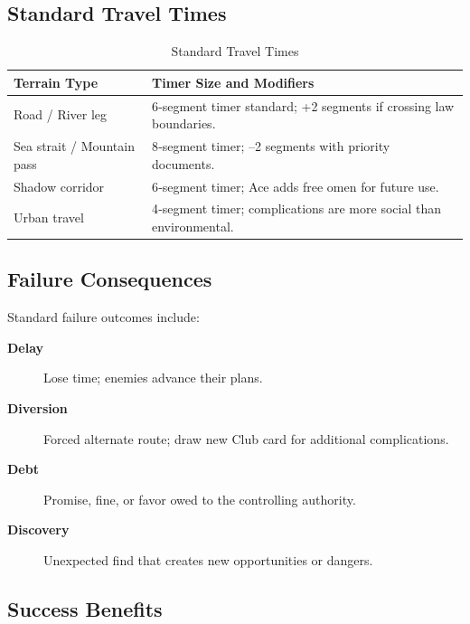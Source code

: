 \subsection{Standard Travel Times}\label{subsec:travel_times}

\begin{longtable}{p{4cm}p{10cm}}
\caption{Standard Travel Times}\label{tab:travel_times}\\
\toprule
\textbf{Terrain Type} & \textbf{Timer Size and Modifiers} \\
\midrule
Road / River leg & 6‑segment timer standard; +2 segments if crossing law boundaries. \\
Sea strait / Mountain pass & 8‑segment timer; --2 segments with priority documents. \\
Shadow corridor & 6‑segment timer; Ace adds free omen for future use. \\
Urban travel & 4‑segment timer; complications are more social than environmental. \\
\bottomrule
\end{longtable}

\subsection{Failure Consequences}\label{subsec:failure_consequences}

Standard failure outcomes include:
\begin{description}
    \item[\textbf{Delay}] Lose time; enemies advance their plans.
    \item[\textbf{Diversion}] Forced alternate route; draw new Club card for additional complications.
    \item[\textbf{Debt}] Promise, fine, or favor owed to the controlling authority.
    \item[\textbf{Discovery}] Unexpected find that creates new opportunities or dangers.
\end{description}

\subsection{Success Benefits}\label{subsec:success_benefits}

